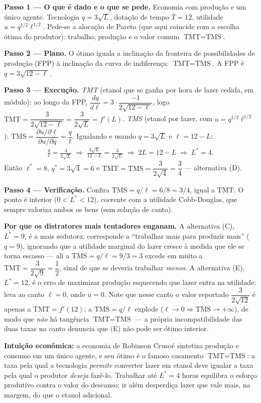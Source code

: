 \begin{solucao}
\textbf{Passo 1 --- O que é dado e o que se pede.} Economia com produção e um único agente. Tecnologia $q=3\sqrt{L}$, dotação de tempo $\bar T=12$, utilidade $u=q^{1/2}\ell^{1/2}$. Pede-se a alocação de Pareto (que aqui coincide com a escolha ótima do produtor): trabalho, produção e o valor comum $\text{TMT}=\text{TMS}$.

\textbf{Passo 2 --- Plano.} O ótimo iguala a inclinação da fronteira de possibilidades de produção (FPP) à inclinação da curva de indiferença: $\text{TMT}=\text{TMS}$. A FPP é $q=3\sqrt{12-\ell}$.

\textbf{Passo 3 --- Execução.} \emph{TMT} (etanol que se ganha por hora de lazer cedida, em módulo): ao longo da FPP, $\dfrac{dq}{d\ell}=3\cdot\dfrac{-1}{2\sqrt{12-\ell}}$, logo $\text{TMT}=\dfrac{3}{2\sqrt{12-\ell}}=\dfrac{3}{2\sqrt{L}}=f'(L)$. \emph{TMS} (etanol por lazer, com $u=q^{1/2}\ell^{1/2}$): $\text{TMS}=\dfrac{\partial u/\partial \ell}{\partial u/\partial q}=\dfrac{q}{\ell}$. Igualando e usando $q=3\sqrt{L}$ e $\ell=12-L$:
\begin{align*}
\frac{q}{\ell}=\frac{3}{2\sqrt{L}} \;\Longrightarrow\; \frac{3\sqrt{L}}{12-L}=\frac{3}{2\sqrt{L}} \;\Longrightarrow\; 2L = 12-L \;\Longrightarrow\; L^{*}=4.
\end{align*}
Então $\ell^{*}=8$, $q^{*}=3\sqrt{4}=6$ e $\text{TMT}=\text{TMS}=\dfrac{3}{2\sqrt{4}}=\dfrac{3}{4}$ --- alternativa (D).

\textbf{Passo 4 --- Verificação.} Confira $\text{TMS}=q/\ell=6/8=3/4$, igual a $\text{TMT}$. O ponto é interior ($0<L^{*}<12$), coerente com a utilidade Cobb-Douglas, que sempre valoriza ambos os bens (sem solução de canto).

\textbf{Por que os distratores mais tentadores enganam.} A alternativa (C), $L^{*}=9$, é a mais sedutora: corresponde a ``trabalhar mais para produzir mais'' ($q=9$), ignorando que a utilidade marginal do lazer cresce à medida que ele se torna escasso --- ali a $\text{TMS}=q/\ell=9/3=3$ excede em muito a $\text{TMT}=\dfrac{3}{2\sqrt{9}}=\dfrac12$, sinal de que se deveria trabalhar \emph{menos}. A alternativa (E), $L^{*}=12$, é o erro de maximizar produção esquecendo que lazer entra na utilidade: leva ao canto $\ell=0$, onde $u=0$. Note que nesse canto o valor reportado $\dfrac{3}{2\sqrt{12}}$ é apenas a $\text{TMT}=f'(12)$; a $\text{TMS}=q/\ell$ explode ($\ell\to 0\Rightarrow \text{TMS}\to+\infty$), de modo que \emph{não} há tangência $\text{TMT}=\text{TMS}$ --- a própria incompatibilidade das duas taxas no canto denuncia que (E) não pode ser ótimo interior.

\textbf{Intuição econômica:} a economia de Robinson Crusoé sintetiza produção e consumo em um único agente, e seu ótimo é o famoso casamento $\text{TMT}=\text{TMS}$: a taxa pela qual a tecnologia \emph{permite} converter lazer em etanol deve igualar a taxa pela qual o produtor \emph{deseja} fazê-lo. Trabalhar até $L^{*}=4$ horas equilibra o esforço produtivo contra o valor do descanso; ir além desperdiça lazer que vale mais, na margem, do que o etanol adicional.
\end{solucao}

